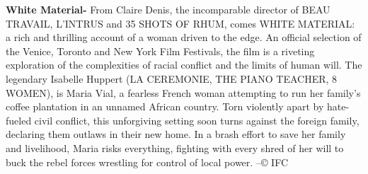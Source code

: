 \documentclass[11pt]{article}
\begin{document}
\textbf{White Material-} From Claire Denis, the incomparable director of BEAU TRAVAIL, L'INTRUS and 35 SHOTS OF RHUM, comes WHITE MATERIAL: a rich and thrilling account of a woman driven to the edge. An official selection of the Venice, Toronto and New York Film Festivals, the film is a riveting exploration of the complexities of racial conflict and the limits of human will. The legendary Isabelle Huppert (LA CEREMONIE, THE PIANO TEACHER, 8 WOMEN), is Maria Vial, a fearless French woman attempting to run her family's coffee plantation in an unnamed African country. Torn violently apart by hate-fueled civil conflict, this unforgiving setting soon turns against the foreign family, declaring them outlaws in their new home. In a brash effort to save her family and livelihood, Maria risks everything, fighting with every shred of her will to buck the rebel forces wrestling for control of local power. --© IFC

\newpage
\end{document}

